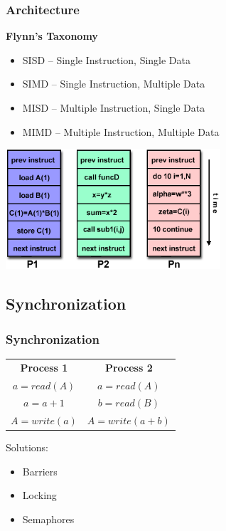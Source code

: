 \documentclass[t]{beamer}
\begin{document}
\begin{frame}
\frametitle{Architecture}
\textbf{Flynn's Taxonomy}
\begin{itemize}
\item SISD -- Single Instruction, Single Data

\item SIMD -- Single Instruction, Multiple Data

\item MISD -- Multiple Instruction, Single Data 

\item MIMD -- Multiple Instruction, Multiple Data
\end{itemize}

\begin{center}
\includegraphics[width=0.6\textwidth]{img/mimd.png} 
\end{center}
\end{frame}
\subsection{Synchronization}
\begin{frame}
\frametitle{Synchronization}
\begin{tabular}{cc}
\textbf{Process 1} & \textbf{Process 2} \\
$a = read(A)$    & $a = read(A)$ \\
$a = a + 1$      & $b = read(B)$ \\
$A = write(a)$   & $A = write(a +b)$
\end{tabular}

\pause
\bigskip

Solutions:
\begin{itemize}
  \item Barriers
  \item Locking
  \item Semaphores
\end{itemize}

\end{frame}
\end{document}
